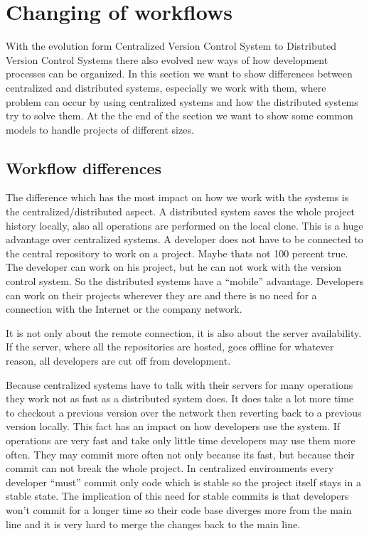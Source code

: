 \section{Changing of workflows}

With the evolution form Centralized Version Control System to Distributed Version Control Systems there also 
evolved new ways of how development processes can be organized. In this section we want to show differences 
between centralized and distributed systems, especially we work with them, where problem can occur by using 
centralized systems and how the distributed systems try to solve them. At the the end of the section we want 
to show some common models to handle projects of different sizes.

\subsection{Workflow differences}

The difference which has the most impact on how we work with the systems is the centralized/distributed aspect. 
A distributed system saves the whole project history locally, also all operations are performed on the local clone. 
This is a huge advantage over centralized systems. A developer does not have to be connected to the central 
repository to work on a project. Maybe thats not 100 percent true. The developer can work on his project, but 
he can not work with the version control system. So the distributed systems have a “mobile” advantage. 
Developers can work on their projects wherever they are and there is no need for a connection with the 
Internet or the company network.

It is not only about the remote connection, it is also about the server availability. If the server, where 
all the repositories are hosted, goes offline for whatever reason, all developers are cut off from development.

Because centralized systems have to talk with their servers for many operations they work not as fast as 
a distributed system does. It does take a lot more time to checkout a previous version over the network 
then reverting back to a previous version locally. This fact has an impact on how developers use the system. 
If operations are very fast and take only little time developers may use them more often. They may commit 
more often not only because its fast, but because their commit can not break the whole project. 
In centralized environments every developer “must” commit only code which is stable so the project 
itself stays in a stable state. The implication of this need for stable commits is that developers won't 
commit for a longer time so their code base diverges more from the main line and it is very hard 
to merge the changes back to the main line.

